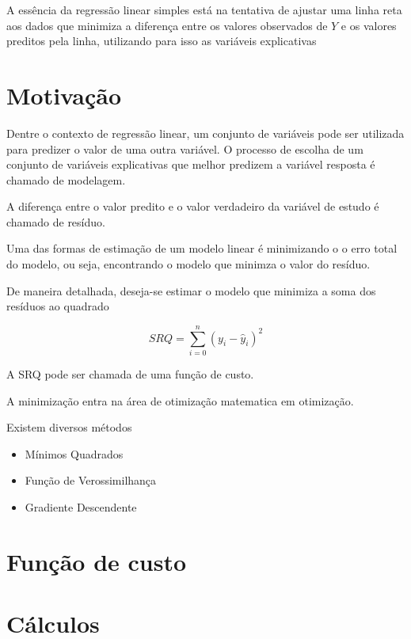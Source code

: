 \documentclass[
  letterpaper,
  DIV=11,
  numbers=noendperiod]{scrreprt}
\begin{document}
A essência da regressão linear simples está na tentativa de ajustar uma
linha reta aos dados que minimiza a diferença entre os valores
observados de \(Y\) e os valores preditos pela linha, utilizando para
isso as variáveis explicativas


\hypertarget{motivauxe7uxe3o}{%
\chapter{Motivação}\label{motivauxe7uxe3o}}

Dentre o contexto de regressão linear, um conjunto de variáveis pode ser
utilizada para predizer o valor de uma outra variável. O processo de
escolha de um conjunto de variáveis explicativas que melhor predizem a
variável resposta é chamado de modelagem.

A diferença entre o valor predito e o valor verdadeiro da variável de
estudo é chamado de resíduo.

Uma das formas de estimação de um modelo linear é minimizando o o erro
total do modelo, ou seja, encontrando o modelo que minimza o valor do
resíduo.

De maneira detalhada, deseja-se estimar o modelo que minimiza a soma dos
resíduos ao quadrado

\[SRQ = \sum^n_{i=0} (y_i - \hat y_i)^2\]

A SRQ pode ser chamada de uma função de custo.

A minimização entra na área de otimização matematica em otimização.

Existem diversos métodos

\begin{itemize}
\item
  Mínimos Quadrados
\item
  Função de Verossimilhança
\item
  Gradiente Descendente
\end{itemize}


\hypertarget{funuxe7uxe3o-de-custo}{%
\chapter{Função de custo}\label{funuxe7uxe3o-de-custo}}


\hypertarget{cuxe1lculos}{%
\chapter{Cálculos}\label{cuxe1lculos}}
\end{document}
